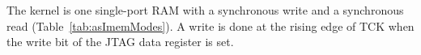 The kernel is one single-port RAM with a synchronous write and a synchronous
read (Table~\ref{tab:asImemModes}). A write is done at the rising edge of
TCK when the write bit of the JTAG data register is set.
